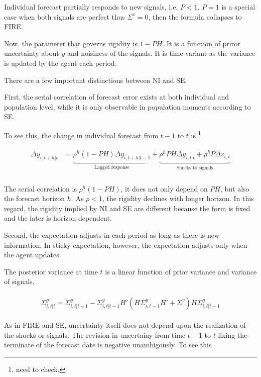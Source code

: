 \documentclass[]{article}
\begin{document}
Individual forecast partially responds to new signals, i.e. $P<1$. $P=1$ is a special case when both signals are perfect thus $\Sigma^v = 0$, then the formula collapses to FIRE. 

Now, the parameter that governs rigidity is $1-PH$. It is a function of priror uncertainty about $y$ and noisiness of the signals. It is time variant as the variance is updated by the agent each period.  

There are a few important distinctions between NI and SE. 

First, the serial correlation of forecast error exists at both individual and population level, while it is only observable in population moments according to SE. 

To see this, the change in individual forecast from $t-1$ to $t$ is \footnote{need to check.}

\begin{eqnarray}
\begin{aligned}
\Delta y_{i,t+h|t} & = \underbrace{\rho^h (1-PH)\Delta y_{i,t+h|t-1}}_{\text{Lagged response}} + \underbrace{\rho^hPH \Delta y_{i,t|t} + \rho^h P\Delta v_{i,t}}_{\text{Shocks to signals}}\\
\end{aligned}
\end{eqnarray}

The serial correlation is $\rho^h(1-PH)$, it does not only depend on $PH$, but also the forecast horizon $h$. As $\rho<1$, the rigidity declines with longer horizon. In this regard, the rigidity implied by NI and SE are different because the form is fixed and the later is horizon dependent.  

Second, the expectation adjusts in each period as long as there is new information. In sticky expectation, however, the expectation adjusts only when the agent updates. 


The posterior variance at time $t$ is a linear function of prior variance and variance of signals. 

\begin{eqnarray}
\begin{aligned}
\Sigma^y_{i,t|t} = \Sigma^y_{i,t|t-1} - \Sigma^y_{i,t|t-1} H'(H \Sigma^y_{i,t-1} H' +\Sigma^v) H \Sigma^y_{i,t|t-1} 
\end{aligned}
\end{eqnarray}


As in FIRE and SE, uncertainty itself does not depend upon the realization of the shocks or signals. The revision in uncertainy from time $t-1$ to $t$ fixing the terminate of the forecast date is negative  unambigously. To see this 
\end{document}
